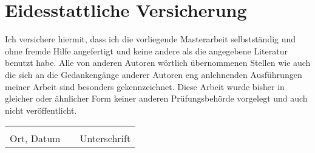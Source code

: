 
\newpage
\listoffigures

\newpage
\lstlistoflistings




\newpage
\thispagestyle{empty}
\section*{Eidesstattliche Versicherung}

Ich versichere hiermit, dass ich die vorliegende Masterarbeit selbstständig und ohne fremde Hilfe angefertigt und keine andere als die angegebene Literatur benutzt habe. Alle von anderen Autoren wörtlich übernommenen Stellen wie auch die sich an die Gedankengänge anderer Autoren eng anlehnenden Ausführungen meiner Arbeit sind besonders gekennzeichnet. Diese Arbeit wurde bisher in gleicher oder ähnlicher Form keiner anderen Prüfungsbehörde vorgelegt und auch nicht veröffentlicht.

\vspace{5cm}
\begin{tabular}{lp{2em}l}
 \hspace{5cm}   && \hspace{4cm} \\\cline{1-1}\cline{3-3}
 Ort, Datum     && Unterschrift
\end{tabular}